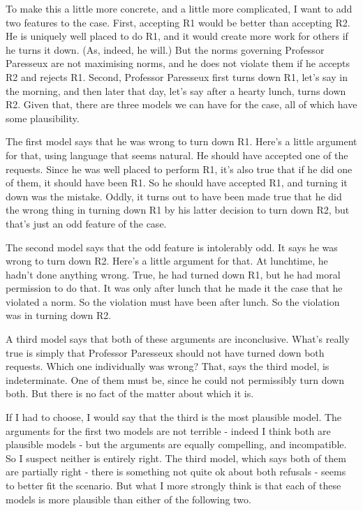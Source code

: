 \documentclass[
  10pt,
  letterpaper,
  twoside]{scrbook}
\begin{document}
To make this a little more concrete, and a little more complicated, I
want to add two features to the case. First, accepting R1 would be
better than accepting R2. He is uniquely well placed to do R1, and it
would create more work for others if he turns it down. (As, indeed, he
will.) But the norms governing Professor Paresseux are not maximising
norms, and he does not violate them if he accepts R2 and rejects R1.
Second, Professor Paresseux first turns down R1, let's say in the
morning, and then later that day, let's say after a hearty lunch, turns
down R2. Given that, there are three models we can have for the case,
all of which have some plausibility.

The first model says that he was wrong to turn down R1. Here's a little
argument for that, using language that seems natural. He should have
accepted one of the requests. Since he was well placed to perform R1,
it's also true that if he did one of them, it should have been R1. So he
should have accepted R1, and turning it down was the mistake. Oddly, it
turns out to have been made true that he did the wrong thing in turning
down R1 by his latter decision to turn down R2, but that's just an odd
feature of the case.

The second model says that the odd feature is intolerably odd. It says
he was wrong to turn down R2. Here's a little argument for that. At
lunchtime, he hadn't done anything wrong. True, he had turned down R1,
but he had moral permission to do that. It was only after lunch that he
made it the case that he violated a norm. So the violation must have
been after lunch. So the violation was in turning down R2.

A third model says that both of these arguments are inconclusive. What's
really true is simply that Professor Paresseux should not have turned
down both requests. Which one individually was wrong? That, says the
third model, is indeterminate. One of them must be, since he could not
permissibly turn down both. But there is no fact of the matter about
which it is.

If I had to choose, I would say that the third is the most plausible
model. The arguments for the first two models are not terrible - indeed
I think both are plausible models - but the arguments are equally
compelling, and incompatible. So I suspect neither is entirely right.
The third model, which says both of them are partially right - there is
something not quite ok about both refusals - seems to better fit the
scenario. But what I more strongly think is that each of these models is
more plausible than either of the following two.
\end{document}
